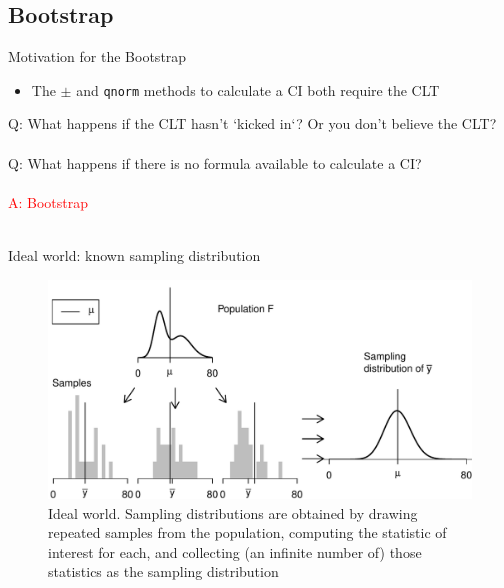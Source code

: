 \documentclass[10pt]{beamer}\usepackage[]{graphicx}\usepackage[]{color}
\makeatletter
\def\maxwidth{ %
  \ifdim\Gin@nat@width>\linewidth
    \linewidth
  \else
    \Gin@nat@width
  \fi
}
\newenvironment{knitrout}{}{} %
\makeatother
\begin{document}
\subsection{Bootstrap}

\begin{frame}{Motivation for the Bootstrap}
	\begin{itemize}
		\setlength\itemsep{2em}
		\item The $\pm$ and \texttt{qnorm} methods to calculate a CI both require the CLT
	\end{itemize}
	
	\pause
	
	\vspace*{0.2in}
	
	\Large \textcolor{myblue}{Q: What happens if the CLT hasn't `kicked in`? Or you don't believe the CLT?} \\ \ \\
	\pause 
	\Large \textcolor{myblue}{Q: What happens if there is no formula available to calculate a CI?} \\ \ \\
	\pause 
	\Large \textcolor{red}{A: Bootstrap} \\ \ \\
\end{frame}



\begin{frame}[fragile]{Ideal world: known sampling distribution}
	
\begin{knitrout}\tiny
{}\color{fgcolor}\begin{figure}

{\centering \includegraphics[width=\maxwidth]{figure/unnamed-chunk-15-1} 

}

\caption{\scriptsize{Ideal world. Sampling distributions are obtained by drawing repeated samples from the population, computing the statistic of interest for each, and collecting (an infinite number of) those statistics as the sampling distribution}}\label{fig:unnamed-chunk-15}
\end{figure}


\end{knitrout}
	
\end{frame}
\end{document}
